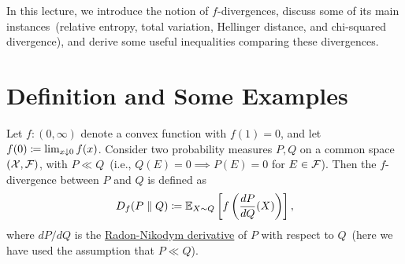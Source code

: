 \documentclass[12pt]{article}
\begin{document}
	\MakeScribeTop

In this lecture, we introduce the notion of $f$-divergences, discuss some of its main instances~(relative entropy, total variation, Hellinger distance, and chi-squared divergence), and derive some useful inequalities comparing these divergences. 

\section{Definition and Some Examples}
\begin{definition}
    \label{def:f-divergence}
    Let $f:(0, \infty)$ denote a convex function with $f(1)=0$, and let $f(0)\coloneqq \lim_{x \downarrow 0} f(x)$. Consider two probability measures $P, Q$ on a common space $({\cal X}, \mathcal{F})$, with $P \ll Q$~(i.e., $Q(E)=0 \implies P(E)=0$ for $E \in {\cal F}$). Then the $f$-divergence between $P$ and $Q$ is defined as 
    \begin{align}
        D_f(P \parallel Q) \coloneqq \mathbb{E}_{X \sim Q} \left[ f\left( \frac{dP}{dQ}(X) \right) \right], \label{eq:f-divergence-def} 
    \end{align}
    where $dP/dQ$ is the \href{https://en.wikipedia.org/wiki/Radon–Nikodym_theorem}{Radon-Nikodym derivative} of $P$ with respect to $Q$~(here we have used the assumption that $P \ll Q$). 
\end{definition}
\end{document}

